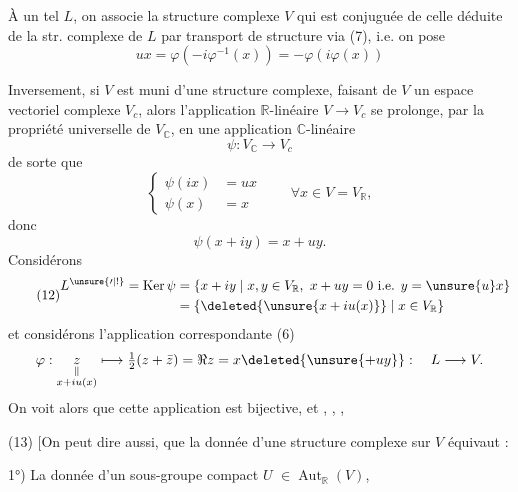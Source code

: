 À un tel $L$, on associe la structure complexe
$V$ qui est conjuguée de celle déduite de la str. complexe de $L$ par transport de structure via (7), i.e. on pose
\[
\tag{8}
ux=\varphi(-i\varphi^{-1}(x))=-\varphi(i\varphi(x))
\]

Inversement, si $V$ est muni d'une structure complexe,  faisant de $V$ un espace vectoriel complexe $V_c$, alors l'application  $\mathbb R$-linéaire $V\longrightarrow V_c$ se prolonge, par la propriété universelle de $V_{\mathbb C}$, en une application $\mathbb C$-linéaire
\[
\tag{9}
\psi:V_{\mathbb C}\longrightarrow V_c
\]
de sorte que
\[
\tag{10}
\left\{\begin{aligned}
\psi(ix)&=ux\\
\psi(x)&=x
\end{aligned}\right.
\qquad\forall x\in V=V_{\mathbb R},
\]
donc
\[
\tag{11}
\psi(x+iy)=x+uy.
\]
  Considérons
\[
\tag{12}
\begin{aligned}
L^{\unsure{\prime|!}}=\operatorname{Ker}\psi
&=\{x+iy\mid x,y\in V_{\mathbb R},\ x+uy=0\ \text{i.e. }y=\unsure{u}x\}\\
&=\{\deleted{\unsure{x+iu(x)}}\mid x\in V_{\mathbb R}\}
\end{aligned}
\]
et considérons l'application correspondante (6)
\[
\begin{gathered}
\varphi:\underset{\substack{\Vert\\x+iu(x)}}z\longmapsto\tfrac12(z+\bar z)
=\Re z=x\deleted{\unsure{+uy}}:\quad L\longrightarrow V .
\end{gathered}
\]
On voit alors que cette application est bijective, et ,
,
,

(13) $[$On peut dire aussi, que la donnée d'une structure complexe sur $V$ équivaut :

1°) La donnée d'un  sous-groupe compact  $U$   $\in\operatorname{Aut}_{\mathbb R}(V)$, 
